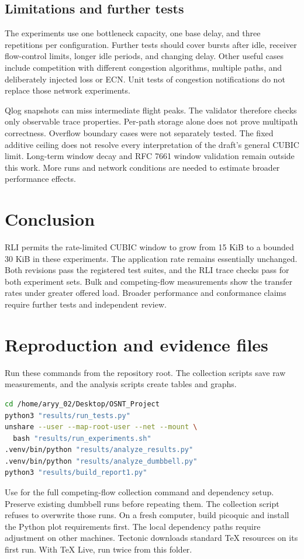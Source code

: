 \documentclass[11pt,a4paper]{article}
\newcommand{\code}[1]{\texttt{\detokenize{#1}}}
\begin{document}
\subsection{Limitations and further tests}
The experiments use one bottleneck capacity, one base delay, and three repetitions per configuration.
Further tests should cover bursts after idle, receiver flow-control limits, longer idle periods, and changing delay.
Other useful cases include competition with different congestion algorithms, multiple paths, and deliberately injected loss or ECN.
Unit tests of congestion notifications do not replace those network experiments.

Qlog snapshots can miss intermediate flight peaks.
The validator therefore checks only observable trace properties.
Per-path storage alone does not prove multipath correctness.
Overflow boundary cases were not separately tested.
The fixed additive ceiling does not resolve every interpretation of the draft's general CUBIC limit.
Long-term window decay and RFC 7661 window validation remain outside this work.
More runs and network conditions are needed to estimate broader performance effects.

\section{Conclusion}
RLI permits the rate-limited CUBIC window to grow from 15 KiB to a bounded 30 KiB in these experiments.
The application rate remains essentially unchanged.
Both revisions pass the registered test suites, and the RLI trace checks pass for both experiment sets.
Bulk and competing-flow measurements show the transfer rates under greater offered load.
Broader performance and conformance claims require further tests and independent review.

\section{Reproduction and evidence files}
Run these commands from the repository root.
The collection scripts save raw measurements, and the analysis scripts create tables and graphs.
\begin{lstlisting}[language=bash]
cd /home/aryy_02/Desktop/OSNT_Project
python3 "results/run_tests.py"
unshare --user --map-root-user --net --mount \
  bash "results/run_experiments.sh"
.venv/bin/python "results/analyze_results.py"
.venv/bin/python "results/analyze_dumbbell.py"
python3 "results/build_report1.py"
\end{lstlisting}
Use  for the full competing-flow collection command and dependency setup.
Preserve existing dumbbell runs before repeating them.
The collection script refuses to overwrite those runs.
On a fresh computer, build picoquic and install the Python plot requirements first.
The local dependency paths require adjustment on other machines.
Tectonic downloads standard TeX resources on its first run.
With TeX Live, run \code{pdflatex report1.tex} twice from this folder.
\end{document}
